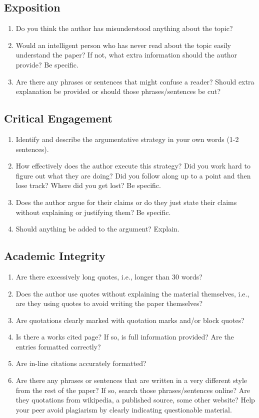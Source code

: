 \documentclass[oneside]{article}
\begin{document}
\subsection{Exposition} 
\begin{enumerate}
\item Do you think the author has misunderstood anything about the topic? 
\item Would an intelligent person who has never read about the topic easily understand the paper? If not, what extra information should the author provide?  Be specific.
\item  Are there any phrases or sentences that might confuse a reader? Should extra explanation be provided or should those phrases/sentences be cut? 
\end{enumerate}


 
\subsection{Critical Engagement}
\begin{enumerate}
\item  Identify and describe the argumentative strategy in your own words (1-2 sentences).
\item How effectively does the author execute this strategy?  Did you work hard to figure out what they are doing?  Did you follow along up to a point and then lose track?  Where did you get lost?  Be specific.
\item Does the author argue for their claims or do they just state their claims without explaining or justifying them?  Be specific. 
\item  Should anything be added to the argument?  Explain.
\end{enumerate}

\subsection{Academic Integrity}
\begin{enumerate}
\item Are there excessively long quotes, i.e., longer than 30 words? 
\item Does the author use quotes without explaining the material themselves, i.e., are they using quotes to avoid writing the paper themselves?
\item Are quotations clearly marked with quotation marks and/or block quotes? 
\item Is there a works cited page? If so, is full information provided? Are the entries formatted correctly? 
\item Are in-line citations accurately formatted? 
\item Are there any phrases or sentences that are written in a very different style from the rest of the paper? If so, search those phrases/sentences online? Are they quotations from wikipedia, a published source, some other website? Help your peer avoid plagiarism by clearly indicating questionable material. 
\end{enumerate}
\end{document}
